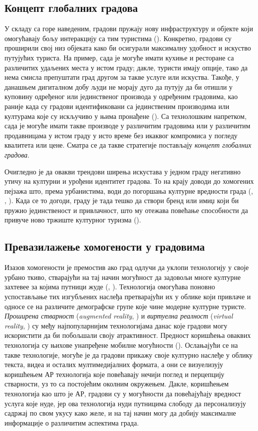 \documentclass{article}
\begin{document}
\subsection{Концепт глобалних градова}
У складу са горе наведеним, градови пружају нову инфраструктуру и објекте који омогућавају бољу интеракцију са тим туристима (\cite{postma}). Конкретно, градови су проширили свој низ објеката како би осигурали максималну удобност и искуство путујућих туриста. На пример, сада је могуће имати кухиње и ресторане са различитих удаљених места у истом граду; дакле, туристи имају опције, тако да нема смисла препуштати град другом за такве услуге или искуства. Такође, у данашњем дигиталном добу људи не морају дуго да путују да би отишли у куповину одређеног или јединственог производа у одређеним градовима, као раније када су градови идентификовани са јединственим производима или културама које су искључиво у њима пронађене (\cite{zukins}). Са технолошким напретком, сада је могуће имати такве производе у различитим градовима или у различитим продавницама у истом граду у исто време без икаквог компромиса у погледу квалитета или цене. Сматра се да такве стратегије постављају \textit{концепт глобалних градова}.

Очигледно је да овакви трендови ширења искустава у једном граду негативно утичу на културни и урођени идентитет градова. То на крају доводи до хомогених пејзажа што, према урбанистима, води до погоршања културне вредности града (\cite{jacobsj}, \cite{alexanderc}, \cite{seamond}). Када се то догоди, граду је тада тешко да створи бренд или имиџ који би пружио јединственост и привлачност, што му отежава повећање способности да привуче ново тржиште културног туризма (\cite{hocaoglu}).

\subsection{Превазилажење хомогености у градовима}
Изазов хомогености је премостив ако град одлучи да уклопи технологију у своје урбано ткиво, стварајући на тај начин могућност да задовољи многе културне захтевее за којима путници жуде (\cite{allamz1}, \cite{allamz2}). Технологија омогућава поновно успостављање тих изгубљених наслеђа претварајући их у облике који привлаче и односе се на различите демографске групе које чине модерне културне туристе. \textit{Проширена стварност} (\textit{augmented reality}, \cite{ar}) и \textit{виртуелна реалност} (\textit{virtual reality}, \cite{vr}) су међу најпопуларнијим технологијама данас које градови могу искористити да би побољшали своју атрактивност. Предност коришћења оваквих технологија су њихове унапређене мобилне могућности (\cite{jungtchungn}). Ослањајући се на такве технологије, могуће је да градови прикажу своје културно наслеђе у облику текста, видеа и осталих мултимедијалних формата, а они се визуелизују коришћењем АР технологија које повећавају нечији поглед и перцепцију стварности, уз то са постојећим околним окружењем. Дакле, коришћењем технологија као што је АР, градови су у могућности да повећајућају вредност услуга које нуде, јер ова технологија нуди путницима слободу да персонализују садржај по свом укусу како желе, и на тај начин могу да добију максималне информације о различитим аспектима града.
\end{document}
